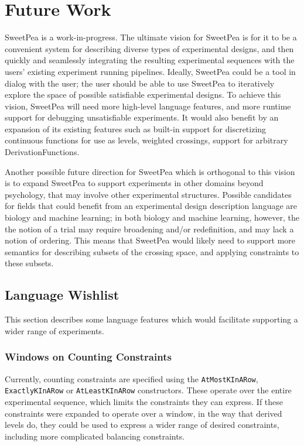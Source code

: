 \chapter{Future Work}

SweetPea is a work-in-progress. The ultimate vision for SweetPea is for it to be a convenient system for describing diverse types of experimental designs, and then quickly and seamlessly integrating the resulting experimental sequences with the users' existing experiment running pipelines. Ideally, SweetPea could be a tool in dialog with the user; the user should be able to use SweetPea to iteratively explore the space of possible satisfiable experimental designs. To achieve this vision, SweetPea will need more high-level language features, and more runtime support for debugging unsatisfiable experiments. It would also benefit by an expansion of its existing features such as built-in support for discretizing continuous functions for use as levels, weighted crossings, support for arbitrary DerivationFunctions.

Another possible future direction for SweetPea which is orthogonal to this vision is to expand SweetPea to support experiments in other domains beyond psychology, that may involve other experimental structures. Possible candidates for fields that could benefit from an experimental design description language are biology and machine learning; in both biology and machine learning, however, the the notion of a trial may require broadening and/or redefinition, and may lack a notion of ordering. This means that SweetPea would likely need to support more semantics for describing subsets of the crossing space, and applying constraints to these subsets.

\section{Language Wishlist}

This section describes some language features which would facilitate supporting a wider range of experiments.

\subsection{Windows on Counting Constraints}
Currently, counting constraints are specified using the \texttt{AtMostKInARow}, \texttt{ExactlyKInARow} or \texttt{AtLeastKInARow} constructors. These operate over the entire experimental sequence, which limits the constraints they can express. If these constraints were expanded to operate over a window, in the way that derived levels do, they could be used to express a wider range of desired constraints, including more complicated balancing constraints.

